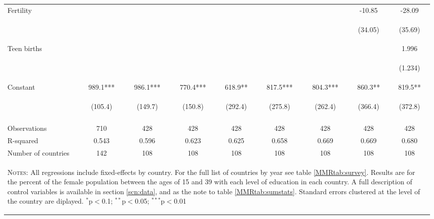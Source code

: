 \begin{landscape}
\begin{table}[htpb!]
\begin{center}
\begin{tabular}{lcccccccc}
Fertility&&&&&&&-10.85&-28.09\\
&&&&&&&\begin{footnotesize}(34.05)\end{footnotesize}&\begin{footnotesize}(35.69)\end{footnotesize}\\
Teen births&&&&&&&&1.996\\
&&&&&&&&\begin{footnotesize}(1.234)\end{footnotesize}\\
Constant&989.1***&986.1***&770.4***&618.9**&817.5***&804.3***&860.3**&819.5**\\
&\begin{footnotesize}(105.4)\end{footnotesize}&\begin{footnotesize}(149.7)\end{footnotesize}&\begin{footnotesize}(150.8)\end{footnotesize}&\begin{footnotesize}(292.4)\end{footnotesize}&\begin{footnotesize}(275.8)\end{footnotesize}&\begin{footnotesize}(262.4)\end{footnotesize}&\begin{footnotesize}(366.4)\end{footnotesize}&\begin{footnotesize}(372.8)\end{footnotesize}\\
&&&&&&&&\\
Observations&710&428&428&428&428&428&428&428\\
R-squared&0.543&0.596&0.623&0.625&0.658&0.669&0.669&0.680\\
Number of countries&142&108&108&108&108&108&108&108\\
\midrule
\multicolumn{9}{p{20cm}}{\begin{footnotesize}\textsc{Notes:} All regressions include fixed-effects by country. For the full list of countries by year see table \ref{MMRtab:survey}.  Results are for the percent of the female population between the ages of  15 and 39 with each level of education in each country.  A full description of control variables is available in section \ref{scn:data}, and as the note to table \ref{MMRtab:sumstats}.  Standard errors clustered at the level of the country are diplayed.
$^{*}$p$<$0.1; $^{**}$p$<$0.05; $^{***}$p$<$0.01\end{footnotesize}} \\ \bottomrule 
\end{tabular}\end{center}\end{table}\end{landscape}